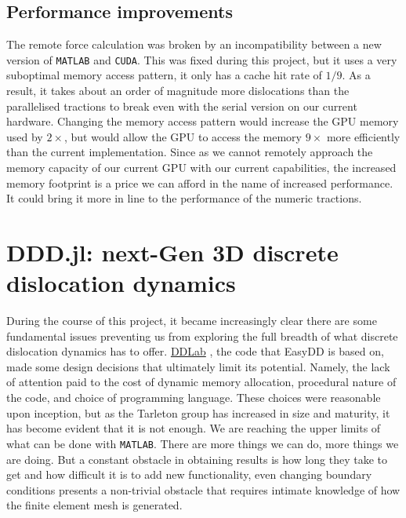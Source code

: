 \subsection{Performance improvements}

The remote force calculation was broken by an incompatibility between a new version of \texttt{MATLAB} and \texttt{CUDA}. This was fixed during this project, but it uses a very suboptimal memory access pattern, it only has a cache hit rate of $1/9$. As a result, it takes about an order of magnitude more dislocations than the parallelised tractions to break even with the serial version on our current hardware. Changing the memory access pattern would increase the GPU memory used by $2\times$, but would allow the GPU to access the memory $9\times$ more efficiently than the current implementation. Since as we cannot remotely approach the memory capacity of our current GPU with our current capabilities, the increased memory footprint is a price we can afford in the name of increased performance. It could bring it more in line to the performance of the numeric tractions.

\section{DDD.jl: next-Gen 3D discrete dislocation dynamics}

During the course of this project, it became increasingly clear there are some fundamental issues preventing us from exploring the full breadth of what discrete dislocation dynamics has to offer. \href{http://micro.stanford.edu/wiki/M01_How_to_Obtain_and_Run_DDLab}{DDLab} \cite{ddlab}, the code that EasyDD is based on, made some design decisions that ultimately limit its potential. Namely, the lack of attention paid to the cost of dynamic memory allocation, procedural nature of the code, and choice of programming language. These choices were reasonable upon inception, but as the Tarleton group has increased in size and maturity, it has become evident that it is not enough. We are reaching the upper limits of what can be done with \texttt{MATLAB}. There are more things we can do, more things we are doing. But a constant obstacle in obtaining results is how long they take to get and how difficult it is to add new functionality, even changing boundary conditions presents a non-trivial obstacle that requires intimate knowledge of how the finite element mesh is generated.

